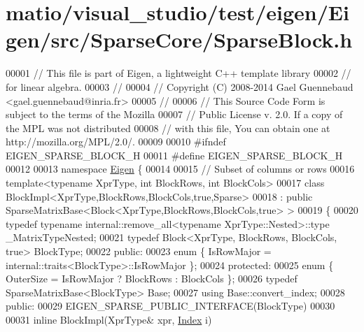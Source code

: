 \hypertarget{matio_2visual__studio_2test_2eigen_2_eigen_2src_2_sparse_core_2_sparse_block_8h_source}{}\section{matio/visual\+\_\+studio/test/eigen/\+Eigen/src/\+Sparse\+Core/\+Sparse\+Block.h}
\label{matio_2visual__studio_2test_2eigen_2_eigen_2src_2_sparse_core_2_sparse_block_8h_source}

\begin{DoxyCode}
00001 \textcolor{comment}{// This file is part of Eigen, a lightweight C++ template library}
00002 \textcolor{comment}{// for linear algebra.}
00003 \textcolor{comment}{//}
00004 \textcolor{comment}{// Copyright (C) 2008-2014 Gael Guennebaud <gael.guennebaud@inria.fr>}
00005 \textcolor{comment}{//}
00006 \textcolor{comment}{// This Source Code Form is subject to the terms of the Mozilla}
00007 \textcolor{comment}{// Public License v. 2.0. If a copy of the MPL was not distributed}
00008 \textcolor{comment}{// with this file, You can obtain one at http://mozilla.org/MPL/2.0/.}
00009 
00010 \textcolor{preprocessor}{#ifndef EIGEN\_SPARSE\_BLOCK\_H}
00011 \textcolor{preprocessor}{#define EIGEN\_SPARSE\_BLOCK\_H}
00012 
00013 \textcolor{keyword}{namespace }\hyperlink{namespace_eigen}{Eigen} \{
00014 
00015 \textcolor{comment}{// Subset of columns or rows}
00016 \textcolor{keyword}{template}<\textcolor{keyword}{typename} XprType, \textcolor{keywordtype}{int} BlockRows, \textcolor{keywordtype}{int} BlockCols>
00017 \textcolor{keyword}{class }BlockImpl<XprType,BlockRows,BlockCols,true,Sparse>
00018   : \textcolor{keyword}{public} SparseMatrixBase<Block<XprType,BlockRows,BlockCols,true> >
00019 \{
00020     \textcolor{keyword}{typedef} \textcolor{keyword}{typename} internal::remove\_all<typename XprType::Nested>::type \_MatrixTypeNested;
00021     \textcolor{keyword}{typedef} Block<XprType, BlockRows, BlockCols, true> BlockType;
00022 \textcolor{keyword}{public}:
00023     \textcolor{keyword}{enum} \{ IsRowMajor = internal::traits<BlockType>::IsRowMajor \};
00024 \textcolor{keyword}{protected}:
00025     \textcolor{keyword}{enum} \{ OuterSize = IsRowMajor ? BlockRows : BlockCols \};
00026     \textcolor{keyword}{typedef} SparseMatrixBase<BlockType> Base;
00027     \textcolor{keyword}{using} Base::convert\_index;
00028 \textcolor{keyword}{public}:
00029     EIGEN\_SPARSE\_PUBLIC\_INTERFACE(BlockType)
00030 
00031     \textcolor{keyword}{inline} BlockImpl(XprType& xpr, \hyperlink{namespace_eigen_a62e77e0933482dafde8fe197d9a2cfde}{Index} i)

\end{DoxyCode}
